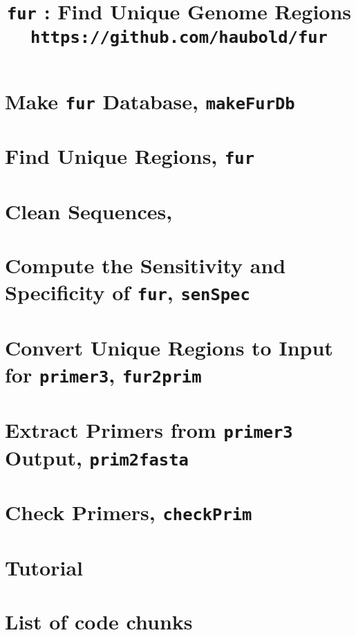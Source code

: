 

\frontmatter
\pagestyle{noweb}

\title{\texttt{fur} : Find Unique Genome
Regions\\\small \texttt{https://github.com/haubold/fur}}
\author{}
\maketitle

\tableofcontents
\listoftheorems[show={tdefn}]
\mainmatter
\chapter{Make \texttt{fur} Database, \texttt{makeFurDb}}\label{ch:makeFurDb}

\chapter{Find Unique Regions, \texttt{fur}}

\chapter{Clean Sequences, }

\chapter{Compute the Sensitivity and Specificity
of \texttt{fur}, \texttt{senSpec}}\label{ch:senSpec}

\chapter{Convert Unique Regions to Input for \texttt{primer3}, \texttt{fur2prim}}

\chapter{Extract Primers from \texttt{primer3}
Output, \texttt{prim2fasta}}

\chapter{Check Primers, \texttt{checkPrim}}

\chapter{Tutorial}\label{ch:tut}


\backmatter
\chapter{List of code chunks}
\nowebchunks



